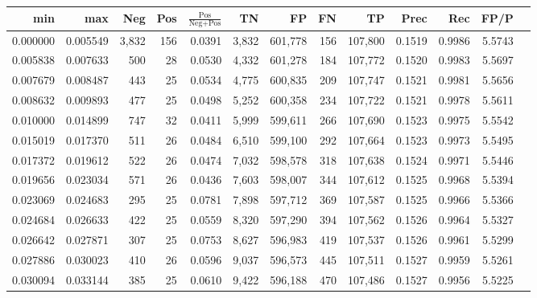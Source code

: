\begin{tabular}{rrrrrrrrrrrrr}
\toprule
     min &      max &   Neg & Pos & $\frac{\text{Pos}}{\text{Neg}+\text{Pos}}$ &      TN &      FP &      FN &      TP &   Prec &    Rec &   FP/P \\
\midrule
0.000000 & 0.005549 & 3,832 & 156 &                                     0.0391 &   3,832 & 601,778 &     156 & 107,800 & 0.1519 & 0.9986 & 5.5743 \\
0.005838 & 0.007633 &   500 &  28 &                                     0.0530 &   4,332 & 601,278 &     184 & 107,772 & 0.1520 & 0.9983 & 5.5697 \\
0.007679 & 0.008487 &   443 &  25 &                                     0.0534 &   4,775 & 600,835 &     209 & 107,747 & 0.1521 & 0.9981 & 5.5656 \\
0.008632 & 0.009893 &   477 &  25 &                                     0.0498 &   5,252 & 600,358 &     234 & 107,722 & 0.1521 & 0.9978 & 5.5611 \\
0.010000 & 0.014899 &   747 &  32 &                                     0.0411 &   5,999 & 599,611 &     266 & 107,690 & 0.1523 & 0.9975 & 5.5542 \\
0.015019 & 0.017370 &   511 &  26 &                                     0.0484 &   6,510 & 599,100 &     292 & 107,664 & 0.1523 & 0.9973 & 5.5495 \\
0.017372 & 0.019612 &   522 &  26 &                                     0.0474 &   7,032 & 598,578 &     318 & 107,638 & 0.1524 & 0.9971 & 5.5446 \\
0.019656 & 0.023034 &   571 &  26 &                                     0.0436 &   7,603 & 598,007 &     344 & 107,612 & 0.1525 & 0.9968 & 5.5394 \\
0.023069 & 0.024683 &   295 &  25 &                                     0.0781 &   7,898 & 597,712 &     369 & 107,587 & 0.1525 & 0.9966 & 5.5366 \\
0.024684 & 0.026633 &   422 &  25 &                                     0.0559 &   8,320 & 597,290 &     394 & 107,562 & 0.1526 & 0.9964 & 5.5327 \\
0.026642 & 0.027871 &   307 &  25 &                                     0.0753 &   8,627 & 596,983 &     419 & 107,537 & 0.1526 & 0.9961 & 5.5299 \\
0.027886 & 0.030023 &   410 &  26 &                                     0.0596 &   9,037 & 596,573 &     445 & 107,511 & 0.1527 & 0.9959 & 5.5261 \\
0.030094 & 0.033144 &   385 &  25 &                                     0.0610 &   9,422 & 596,188 &     470 & 107,486 & 0.1527 & 0.9956 & 5.5225 \\

\end{tabular}
